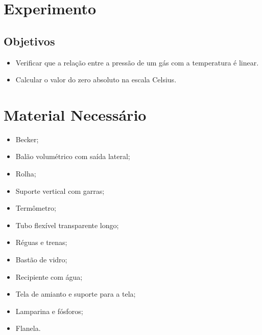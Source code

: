 \section{Experimento}

\subsection{Objetivos}

\begin{itemize}
	\item Verificar que a relação entre a pressão de um gás com a temperatura é linear.
	\item Calcular o valor do zero absoluto na escala Celsius.
\end{itemize}

\section{Material Necessário}

\begin{multicols}{2}
\begin{itemize}
	\item Becker;
	\item Balão volumétrico com saída lateral;
	\item Rolha;
	\item Suporte vertical com garras;
	\item Termômetro;
	\item Tubo flexível transparente longo;
	\item Réguas e trenas;
	\item Bastão de vidro;
	\item Recipiente com água;
	\item Tela de amianto e suporte para a tela;
	\item Lamparina e fósforos;
	\item Flanela.
\end{itemize}
\end{multicols}

